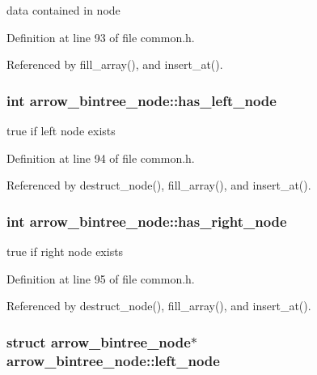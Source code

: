 data contained in node 

Definition at line 93 of file common.h.

Referenced by fill\_\-array(), and insert\_\-at().\hypertarget{structarrow__bintree__node_a359d3d029023fb8763af3329207ee53}{
\subsubsection[{has\_\-left\_\-node}]{\setlength{\rightskip}{0pt plus 5cm}int {\bf arrow\_\-bintree\_\-node::has\_\-left\_\-node}}}
\label{structarrow__bintree__node_a359d3d029023fb8763af3329207ee53}


true if left node exists 

Definition at line 94 of file common.h.

Referenced by destruct\_\-node(), fill\_\-array(), and insert\_\-at().\hypertarget{structarrow__bintree__node_f6f8bb35c520a88841a810777e9bc186}{
\subsubsection[{has\_\-right\_\-node}]{\setlength{\rightskip}{0pt plus 5cm}int {\bf arrow\_\-bintree\_\-node::has\_\-right\_\-node}}}
\label{structarrow__bintree__node_f6f8bb35c520a88841a810777e9bc186}


true if right node exists 

Definition at line 95 of file common.h.

Referenced by destruct\_\-node(), fill\_\-array(), and insert\_\-at().\hypertarget{structarrow__bintree__node_e7eb125cad02704a57796b16c49b2983}{
\subsubsection[{left\_\-node}]{\setlength{\rightskip}{0pt plus 5cm}struct {\bf arrow\_\-bintree\_\-node}$\ast$ {\bf arrow\_\-bintree\_\-node::left\_\-node}}}
\label{structarrow__bintree__node_e7eb125cad02704a57796b16c49b2983}


